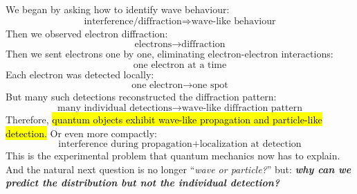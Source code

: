 \highspace
\begin{takeawaysbox}
    We began by asking how to identify wave behaviour:
    \begin{equation*}
        \text{interference/diffraction}
        \Rightarrow
        \text{wave-like behaviour}
    \end{equation*}
    Then we observed electron diffraction:
    \begin{equation*}
        \text{electrons}
        \rightarrow
        \text{diffraction}
    \end{equation*}
    Then we sent electrons one by one, eliminating electron-electron interactions:
    \begin{equation*}
        \text{one electron at a time}
    \end{equation*}
    Each electron was detected locally:
    \begin{equation*}
        \text{one electron} \rightarrow \text{one spot}
    \end{equation*}
    But many such detections reconstructed the diffraction pattern:
    \begin{equation*}
        \text{many individual detections}
        \rightarrow
        \text{wave-like diffraction pattern}
    \end{equation*}
    Therefore, \hl{quantum objects exhibit wave-like propagation and particle-like detection.} Or even more compactly:
    \begin{equation*}
        \text{interference during propagation}
        +
        \text{localization at detection}
    \end{equation*}
    This is the experimental problem that quantum mechanics now has to explain. And the natural next question is no longer ``\emph{wave or particle?}'' but: \emph{\textbf{why can we predict the distribution but not the individual detection?}}

    \begin{center}
\end{center}
\end{takeawaysbox}
